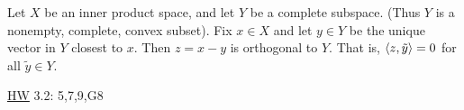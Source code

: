 \documentclass[]{article}
\begin{document}
\begin{lemma}
	Let $X$ be an inner product space, and let $Y$ be a complete subspace.
	(Thus $Y$ is a nonempty, complete, convex subset).
	Fix $x\in X$ and let $y\in Y$ be the unique vector in $Y$ closest to $x$.
	Then $z = x-y$ is orthogonal to $Y$. That is, $\langle z,\tilde y \rangle=0$ for all $\tilde y\in Y$.
\end{lemma}

\ul{HW} 3.2: 5,7,9,G8
\end{document}
